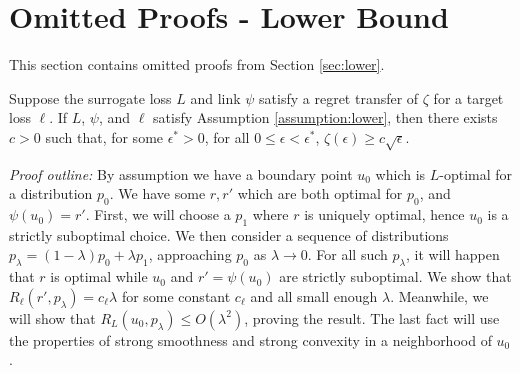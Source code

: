 \section{Omitted Proofs - Lower Bound} \label{app:lower}
This section contains omitted proofs from Section \ref{sec:lower}.

\begin{theorem*}
  Suppose the surrogate loss $L$ and link $\psi$ satisfy a regret transfer of $\zeta$ for a target loss $\ell$.
  If $L$, $\psi$, and $\ell$ satisfy Assumption \ref{assumption:lower}, then there exists $c > 0$ such that, for some $\epsilon^* > 0$, for all $0 \leq \epsilon < \epsilon^*$, $\zeta(\epsilon) \geq c \sqrt{\epsilon}$.
\end{theorem*}

\emph{Proof outline:} By assumption we have a boundary point $u_0$ which is $L$-optimal for a distribution $p_0$.
We have some $r,r'$ which are both optimal for $p_0$, and $\psi(u_0) = r'$.
First, we will choose a $p_1$ where $r$ is uniquely optimal, hence $u_0$ is a strictly suboptimal choice.
We then consider a sequence of distributions $p_{\lambda} = (1-\lambda) p_0 + \lambda p_1$, approaching $p_0$ as $\lambda \to 0$.
For all such $p_{\lambda}$, it will happen that $r$ is optimal while $u_0$ and $r' = \psi(u_0)$ are strictly suboptimal.
We show that $R_{\ell}(r', p_{\lambda}) = c_{\ell} \lambda$ for some constant $c_{\ell}$ and all small enough $\lambda$.
Meanwhile, we will show that $R_L(u_0, p_{\lambda}) \leq O(\lambda^2)$, proving the result.
The last fact will use the properties of strong smoothness and strong convexity in a neighborhood of $u_0$.

